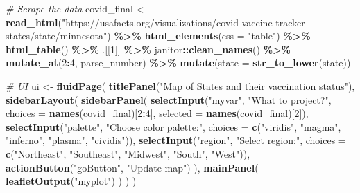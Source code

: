 \documentclass[
]{book}
\newenvironment{Shaded}{\begin{snugshade}}{\end{snugshade}}
\newcommand{\AttributeTok}[1]{\textcolor[rgb]{0.13,0.29,0.53}{#1}}
\newcommand{\CommentTok}[1]{\textcolor[rgb]{0.56,0.35,0.01}{\textit{#1}}}
\newcommand{\DecValTok}[1]{\textcolor[rgb]{0.00,0.00,0.81}{#1}}
\newcommand{\FunctionTok}[1]{\textcolor[rgb]{0.13,0.29,0.53}{\textbf{#1}}}
\newcommand{\NormalTok}[1]{#1}
\newcommand{\OtherTok}[1]{\textcolor[rgb]{0.56,0.35,0.01}{#1}}
\newcommand{\SpecialCharTok}[1]{\textcolor[rgb]{0.81,0.36,0.00}{\textbf{#1}}}
\newcommand{\StringTok}[1]{\textcolor[rgb]{0.31,0.60,0.02}{#1}}
\begin{document}
\begin{Shaded}
\begin{Highlighting}[]
\CommentTok{\# Scrape the data}
\NormalTok{covid\_final }\OtherTok{\textless{}{-}} \FunctionTok{read\_html}\NormalTok{(}\StringTok{"https://usafacts.org/visualizations/covid{-}vaccine{-}tracker{-}states/state/minnesota"}\NormalTok{) }\SpecialCharTok{\%\textgreater{}\%}
  \FunctionTok{html\_elements}\NormalTok{(}\AttributeTok{css =} \StringTok{"table"}\NormalTok{) }\SpecialCharTok{\%\textgreater{}\%} \FunctionTok{html\_table}\NormalTok{() }\SpecialCharTok{\%\textgreater{}\%}\NormalTok{ .[[}\DecValTok{1}\NormalTok{]] }\SpecialCharTok{\%\textgreater{}\%}
\NormalTok{  janitor}\SpecialCharTok{::}\FunctionTok{clean\_names}\NormalTok{() }\SpecialCharTok{\%\textgreater{}\%}
  \FunctionTok{mutate\_at}\NormalTok{(}\DecValTok{2}\SpecialCharTok{:}\DecValTok{4}\NormalTok{, parse\_number) }\SpecialCharTok{\%\textgreater{}\%} \FunctionTok{mutate}\NormalTok{(}\AttributeTok{state =} \FunctionTok{str\_to\_lower}\NormalTok{(state))}



\CommentTok{\# UI}
\NormalTok{ui }\OtherTok{\textless{}{-}} \FunctionTok{fluidPage}\NormalTok{(}
  \FunctionTok{titlePanel}\NormalTok{(}\StringTok{"Map of States and their vaccination status"}\NormalTok{),}
  \FunctionTok{sidebarLayout}\NormalTok{(}
    \FunctionTok{sidebarPanel}\NormalTok{(}
      \FunctionTok{selectInput}\NormalTok{(}\StringTok{"myvar"}\NormalTok{, }\StringTok{"What to project?"}\NormalTok{, }\AttributeTok{choices =} \FunctionTok{names}\NormalTok{(covid\_final)[}\DecValTok{2}\SpecialCharTok{:}\DecValTok{4}\NormalTok{], }\AttributeTok{selected =} \FunctionTok{names}\NormalTok{(covid\_final)[}\DecValTok{2}\NormalTok{]),}
      \FunctionTok{selectInput}\NormalTok{(}\StringTok{"palette"}\NormalTok{, }\StringTok{"Choose color palette:"}\NormalTok{, }\AttributeTok{choices =} \FunctionTok{c}\NormalTok{(}\StringTok{"viridis"}\NormalTok{, }\StringTok{"magma"}\NormalTok{, }\StringTok{"inferno"}\NormalTok{, }\StringTok{"plasma"}\NormalTok{, }\StringTok{"cividis"}\NormalTok{)),}
      \FunctionTok{selectInput}\NormalTok{(}\StringTok{"region"}\NormalTok{, }\StringTok{"Select region:"}\NormalTok{, }\AttributeTok{choices =} \FunctionTok{c}\NormalTok{(}\StringTok{"Northeast"}\NormalTok{, }\StringTok{"Southeast"}\NormalTok{, }\StringTok{"Midwest"}\NormalTok{, }\StringTok{"South"}\NormalTok{, }\StringTok{"West"}\NormalTok{)),}
      \FunctionTok{actionButton}\NormalTok{(}\StringTok{"goButton"}\NormalTok{, }\StringTok{"Update map"}\NormalTok{)}
\NormalTok{    ),}
    \FunctionTok{mainPanel}\NormalTok{(}
      \FunctionTok{leafletOutput}\NormalTok{(}\StringTok{"myplot"}\NormalTok{)}
\NormalTok{    )}
\NormalTok{  ) }
\NormalTok{)}



\end{Highlighting}
\end{Shaded}
\end{document}
